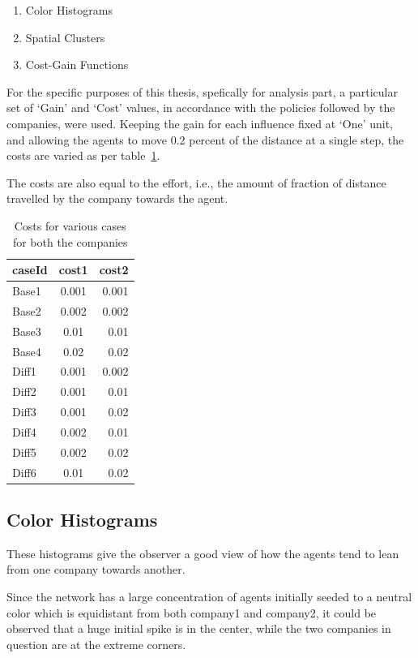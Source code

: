 \begin{enumerate}
\item[1] Color Histograms
\item[2] Spatial Clusters
\item[3] Cost-Gain Functions
\end{enumerate}

For the specific purposes of this thesis, spefically for analysis part, a particular set of `Gain' and `Cost' values, in accordance with the policies followed by the companies, were used. Keeping the gain for each influence fixed at `One' unit, and allowing the agents to move 0.2 percent of the distance at a single step, the costs are varied as per table~\ref{table:cost}.

The costs are also equal to the effort, i.e., the amount of fraction of distance travelled by the company towards the agent.

\begin{table}
\begin{center}
\begin{tabular}{|l||c|r|}
\hline
caseId & cost1 & cost2 \\ \hline 
Base1 & 0.001 & 0.001 \\ 
Base2 & 0.002 & 0.002 \\
Base3 & 0.01 & 0.01 \\
Base4 & 0.02 & 0.02 \\
Diff1 & 0.001 & 0.002 \\
Diff2 & 0.001 & 0.01 \\
Diff3 & 0.001 & 0.02 \\
Diff4 & 0.002 & 0.01 \\
Diff5 & 0.002 & 0.02 \\
Diff6 & 0.01 & 0.02 \\
\hline
\end{tabular} 
\caption[Cost ]{Costs for various cases for both the companies}
\label{table:cost}
\end{center}
\end{table}

\subsection{Color Histograms}

These histograms give the observer a good view of how the agents tend to lean from one company towards another.

Since the network has a large concentration of agents initially seeded to a neutral color which is equidistant from both company1 and company2, it could be observed that a huge initial spike is in the center, while the two companies in question are at the extreme corners.

